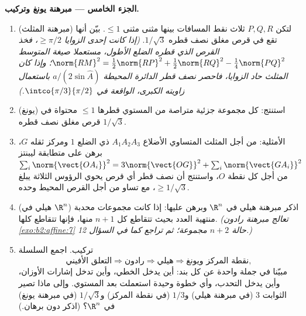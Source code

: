 \begin{problem}
\medskip
\noindent\textbf{الجزء الخامس --- مبرهنة يونغ وتركيب.}
\begin{enumerate}[resume]
  \item (مبرهنة المثلث) لتكن $P, Q, R$ ثلاث نقط المسافات بينها مثنى
        مثنى $\leq 1$. بيّن أنها تقع في قرص مغلق نصف قطره $1/\sqrt3$.
        \emph{(إذا كانت إحدى الزوايا $\geq \pi/2$، فخذ القرص الذي قطره
        الضلع الأطول، مستعملا صيغة المتوسط $\norm{RM}^2 = \tfrac12\norm{RP}^2 +
        \tfrac12\norm{RQ}^2 - \tfrac14\norm{PQ}^2$؛ وإذا كان المثلث
        حاد الزوايا، فاحصر نصف قطر الدائرة المحيطة $a/(2\sin
        \widehat A)$ باستعمال
        زاويته الكبرى، الواقعة في $\intco{\pi/3}{\pi/2}$.)}
  \item (يونغ) استنتج: كل مجموعة جزئية متراصة من المستوي قطرها
        $\leq 1$ محتواة في قرص مغلق نصف قطره $1/\sqrt3$.
  \item الأمثلية: من أجل المثلث المتساوي الأضلاع $A_1A_2A_3$ ذي الضلع
        $1$ ومركز ثقله $G$، برهن على متطابقة ليبنتز $\sum_i \norm{\vect{OA_i}}^2 =
        3\norm{\vect{OG}}^2 + \sum_i \norm{\vect{GA_i}}^2$
        من أجل كل نقطة $O$، واستنتج أن نصف قطر أي قرص يحوي الرؤوس
        الثلاثة يبلغ $\geq
        1/\sqrt3$، مع تساو من أجل القرص المحيط وحده.
  \item (هيلي في $\R^n$) اذكر مبرهنة هيلي في $\R^n$ وبرهن عليها:
        إذا كانت مجموعات محدبة منتهية العدد بحيث تتقاطع كل $n + 1$
        منها، فإنها تتقاطع كلها. \emph{(تعالج مبرهنة رادون \cref{exo:b2:affine:7}
        حالة $n + 2$ مجموعة؛ ثم تراجع كما في السؤال 12.)}
  \item تركيب. اجمع السلسلة
        \[
        \text{التعلق الأفيني} \Rightarrow \text{رادون}
        \Rightarrow \text{هيلي} \Rightarrow
        \text{نقطة المركز ويونغ},
        \]
        مبيّنا في جملة واحدة عن كل بند: أين يدخل  الخطي، وأين
        تدخل إشارات الأوزان، وأين يدخل التحدب، وأي خطوة وحيدة
        استعملت بعد المستوي. وإلى ماذا تصير الثوابت $3$ (في
        مبرهنة هيلي) و$1/3$ (في نقطة المركز) و$1/\sqrt3$ (في مبرهنة
        يونغ) في $\R^n$؟ (اذكر دون برهان.)
\end{enumerate}
\end{problem}
